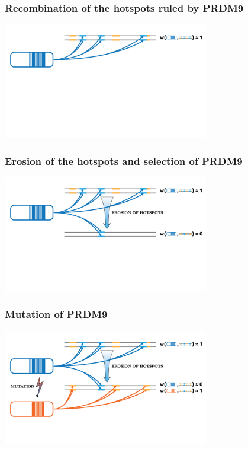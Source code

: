 \documentclass[10pt]{beamer}
\begin{document}
\begin{frame}
\frametitle{Recombination of the hotspots ruled by PRDM9}
	\begin{center}
       \includegraphics[width=9cm]{Images/red-queen-1.png}
	\end{center}
\end{frame}

\begin{frame}
\frametitle{Erosion of the hotspots and selection of PRDM9}
	\begin{center}
       \includegraphics[width=9cm]{Images/red-queen-2.png}
	\end{center}
\end{frame}

\begin{frame}
\frametitle{Mutation of PRDM9}
	\begin{center}
       \includegraphics[width=9cm]{Images/red-queen-4.png}
	\end{center}
\end{frame}
\end{document}
